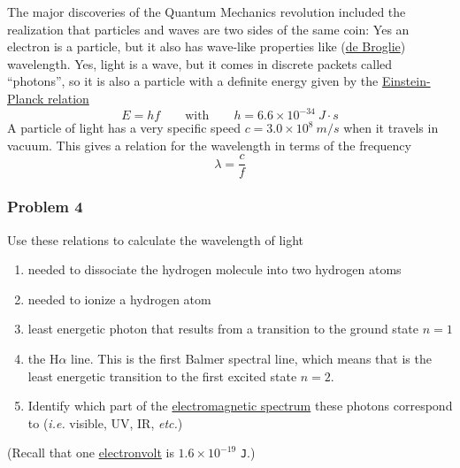 \documentclass[11pt]{article}
\begin{document}
    The major discoveries of the Quantum Mechanics revolution included the
realization that particles and waves are two sides of the same coin: Yes
an electron is a particle, but it also has wave-like properties like
(\href{https://en.wikiversity.org/wiki/De_Broglie_wavelength}{de
Broglie}) wavelength. Yes, light is a wave, but it comes in discrete
packets called ``photons'', so it is also a particle with a definite
energy given by the
\href{https://en.wikipedia.org/wiki/Planck_relation}{Einstein-Planck
relation} 
$$
    E=hf\quad \quad \textrm{with}\quad \quad h=6.6\times 10^{-34}\ J\cdot s  
$$
A particle of light has a very specific speed
\(c=3.0\times 10^8\ m/s\) when it travels in vacuum. This gives a
relation for the wavelength in terms of the frequency \[
    \lambda = \frac cf      \tag{4}
\]

 
\subsubsection{Problem 4}\label{problem-4}

Use these relations to calculate the wavelength of light

\begin{enumerate}
\def\labelenumi{\alph{enumi}.}
\item
  needed to dissociate the hydrogen molecule into two hydrogen atoms
\item
  needed to ionize a hydrogen atom
\item
  least energetic photon that results from a transition to the ground
  state \(n=1\)
\item
  the H\(\alpha\) line. This is the first Balmer spectral line, which
  means that is the least energetic transition to the first excited
  state \(n=2\).
\item
  Identify which part of the
  \href{https://en.wikipedia.org/wiki/Electromagnetic_spectrum}{electromagnetic
  spectrum} these photons correspond to (\emph{i.e.} visible, UV, IR,
  \emph{etc.})
\end{enumerate}

(Recall that one
\href{https://en.wikipedia.org/wiki/Electronvolt}{electronvolt} is
\(1.6\times 10^{-19}\) \texttt{J}.)
 
\end{document}
